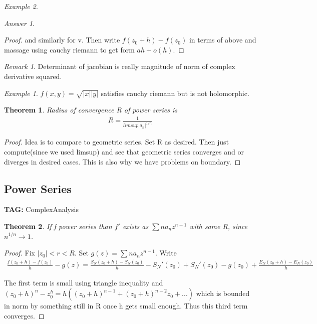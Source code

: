 \documentclass[11pt]{article}
\newtheorem{theorem}{Theorem}
\theoremstyle{remark}
\newtheorem{remark}{Remark}
\newtheorem{ans}{Answer}
\newtheorem{example}{Example}
\begin{document}
\begin{example}
\begin{ans}
\begin{proof}
		and similarly for v. Then write $f(z_0 + h) - f(z_0)$ in terms of above and massage using cauchy riemann to get form $ah + o(h)$. 
	\end{proof}
\end{ans}

\begin{remark}
	Determinant of jacobian is really magnitude of norm of complex derivative squared.
\end{remark}

\begin{example}
	$f(x,y) = \sqrt{|x||y|}$ satisfies cauchy riemann but is  not holomorphic. 
\end{example}

\begin{theorem}
	Radius of convergence R of power series is
	\begin{align*}
		R = \frac{1}{limsup |a_n|^{1/n}}
	\end{align*}
\end{theorem}

\begin{proof}
	Idea is to compare to geometric series. Set R as desired. Then just compute(since we used limsup) and see that geometric series converges and or diverges in desired cases. This is also why we have problems on boundary. 
\end{proof}

\subsection{Power Series}

\textbf{TAG:} ComplexAnalysis

\begin{theorem}
	If f power series than $f'$ exists as $\sum n a_n z^{n-1}$ with same R, since $n^{1/n} \to 1$. 
\end{theorem}

\begin{proof}
	Fix $|z_0| < r < R$. Set $g(z) = \sum na_nz^{n-1}$. Write
	\begin{align*}
		\frac{f(z_0+h)-f(z_0)}{h} - g(z) = \frac{S_N(z_0+h)-S_N(z_0)}{h} - S_N'(z_0) + S_N'(z_0)-g(z_0) + \frac{E_N(z_0+h) - E_N(z_0)}{h}
	\end{align*}

	The first term is small using triangle inequality and $(z_0 + h)^n - z_0^h = h((z_0+h)^{n-1}+(z_0+h)^{n-2}z_0 + ...)$ which is bounded in norm by something still in R once h gets small enough. Thus this third term converges.


\end{proof}
\end{example}
\end{document}
